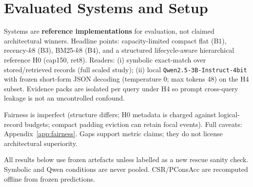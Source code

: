 \section{Evaluated Systems and Setup}
\label{sec:systems}
\label{sec:setup}

Systems are \textbf{reference implementations} for evaluation, not claimed architectural winners. Headline points: capacity-limited compact flat (B1), recency-$k8$ (B3), BM25-$k8$ (B4), and a structured lifecycle-aware hierarchical reference H0 (cap150, ret8). Readers: (i) symbolic exact-match over stored/retrieved records (full scaled study); (ii) local \texttt{Qwen2.5-3B-Instruct-4bit} with frozen short-form JSON decoding (temperature 0; max tokens 48) on the H4 subset. Evidence packs are isolated per query under H4 so prompt cross-query leakage is not an uncontrolled confound.

Fairness is imperfect (structure differs; H0 metadata is charged against logical-record budgets; compact padding eviction can retain focal events). Full caveats: Appendix~\ref{app:fairness}. Gaps support metric claims; they do not license architectural superiority.

All results below use frozen artefacts unless labelled as a new rescue sanity check. Symbolic and Qwen conditions are never pooled. CSR/PConsAcc are recomputed offline from frozen predictions.

